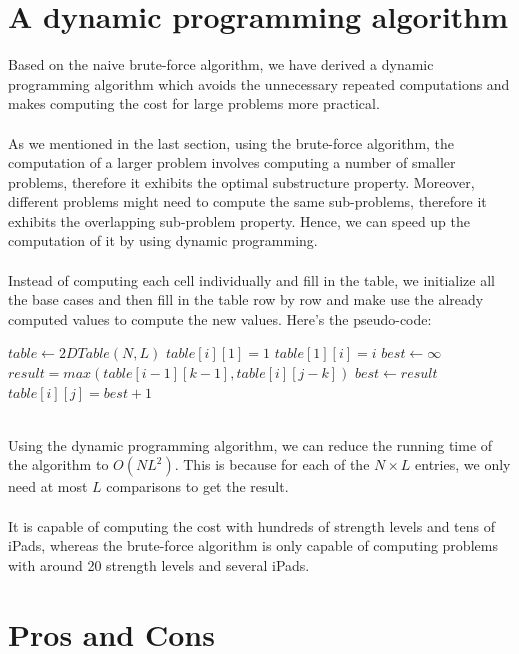 \documentclass[12pt,a4paper,oneside]{report}
\begin{document}
\section{A dynamic programming algorithm}
Based on the naive brute-force algorithm, we have derived a dynamic programming algorithm which avoids the unnecessary repeated computations and makes computing the cost for large problems more practical. \\\\
As we mentioned in the last section, using the brute-force algorithm, the computation of a larger problem involves computing a number of smaller problems, therefore it exhibits the optimal substructure property. Moreover, different problems might need to compute the same sub-problems, therefore it exhibits the overlapping sub-problem property. Hence, we can speed up the computation of it by using dynamic programming. \\\\
Instead of computing each cell individually and fill in the table, we initialize all the base cases and then fill in the table row by row and make use the already computed values to compute the new values. Here's the pseudo-code:
\begin{algorithm}
\caption{$makeTable(N, L)$}
\begin{algorithmic}[1]
\STATE $table \leftarrow 2DTable(N, L)$
	\STATE $table[i][1] = 1$
\ENDFOR
{}
	\STATE $table[1][i] = i$
\ENDFOR
{}
		\STATE $best \leftarrow \infty$
			\STATE $result = max(table[i - 1][k - 1], table[i][j - k])$
				\STATE $best \leftarrow result$
			\ENDIF
		\ENDFOR
		\STATE $table[i][j] = best + 1$
	\ENDFOR
\ENDFOR
\end{algorithmic}
\end{algorithm}
~\\
Using the dynamic programming algorithm, we can reduce the running time of the algorithm to $O(NL^2)$. This is because for each of the $N \times L$ entries, we only need at most $L$ comparisons to get the result. \\\\
It is capable of computing the cost with hundreds of strength levels and tens of iPads, whereas the brute-force algorithm is only capable of computing problems with around 20 strength levels and several iPads.
\section{Pros and Cons}
\end{document}
